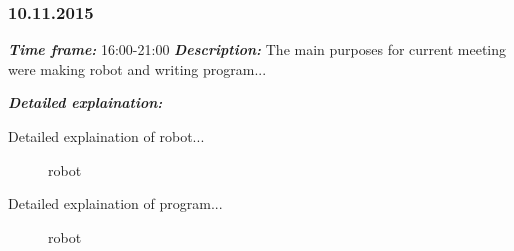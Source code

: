 \subsubsection{10.11.2015}
	\textit{\textbf{Time frame:}} 16:00-21:00 \newline
	\textit{\textbf{Description:}} The main purposes for current meeting were making robot and writing program...\newline \newline

  \textit{\textbf{Detailed explaination:}}
  \begin{enumerate*}
  	\item Detailed explaination of robot...
  	\begin{figure}[H]
  		\begin{minipage}[h]{1\linewidth}
  			\caption{robot}
  		\end{minipage}
  	\end{figure}
  	
  	\item Detailed explaination of program...
  	\begin{figure}[H]
  		\begin{minipage}[h]{1\linewidth}
  			\caption{robot}
  		\end{minipage}
  	\end{figure}
  	
  \end{enumerate*}
  
\fillpage
